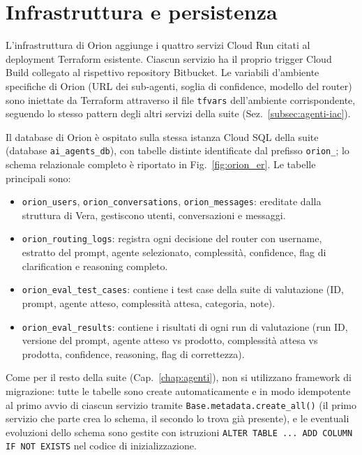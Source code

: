 \section{Infrastruttura e persistenza}
\label{sec:orion-impl-iac}
\label{sec:orion-impl-db}

L'infrastruttura di Orion aggiunge i quattro servizi Cloud Run citati al deployment Terraform esistente.
Ciascun servizio ha il proprio trigger Cloud Build collegato al rispettivo repository Bitbucket.
Le variabili d'ambiente specifiche di Orion (URL dei sub-agenti, soglia di confidence, modello del router)
sono iniettate da Terraform attraverso il file \texttt{tfvars} dell'ambiente corrispondente, seguendo lo stesso pattern
degli altri servizi della suite (Sez.~\ref{subsec:agenti-iac}).

Il database di Orion è ospitato sulla stessa istanza Cloud SQL della suite (database \texttt{ai\_agents\_db}),
con tabelle distinte identificate dal prefisso \texttt{orion\_}; lo schema relazionale completo è riportato in Fig.~\ref{fig:orion_er}. Le tabelle principali sono:

\begin{itemize}
  \item \texttt{orion\_users}, \texttt{orion\_conversations}, \texttt{orion\_messages}: ereditate dalla struttura di Vera, gestiscono utenti, conversazioni e messaggi.
  \item \texttt{orion\_routing\_logs}: registra ogni decisione del router con username, estratto del prompt, agente selezionato, complessità, confidence, flag di clarification e reasoning completo.
  \item \texttt{orion\_eval\_test\_cases}: contiene i test case della suite di valutazione (ID, prompt, agente atteso, complessità attesa, categoria, note).
  \item \texttt{orion\_eval\_results}: contiene i risultati di ogni run di valutazione (run ID, versione del prompt, agente atteso vs prodotto, complessità attesa vs prodotta, confidence, reasoning, flag di correttezza).
\end{itemize}

Come per il resto della suite (Cap.~\ref{chap:agenti}), non si utilizzano
framework di migrazione: tutte le tabelle sono create automaticamente e in
modo idempotente al primo avvio di ciascun servizio tramite
\texttt{Base.metadata.create\_all()} (il primo servizio che parte crea lo
schema, il secondo lo trova già presente), e le eventuali evoluzioni dello
schema sono gestite con istruzioni \texttt{ALTER TABLE ... ADD COLUMN IF NOT
EXISTS} nel codice di inizializzazione.

